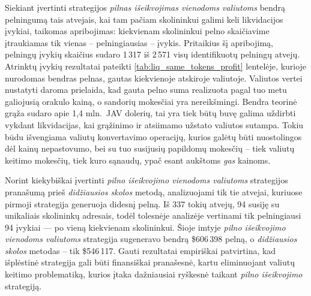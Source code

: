 \documentclass[]{VUMIFTemplateClass}
\begin{document}

Siekiant įvertinti strategijos \textit{pilnas išeikvojimas vienodoms valiutoms} bendrą pelningumą tais atvejais, kai tam pačiam skolininkui galimi keli likvidacijos įvykiai, taikomas apribojimas: kiekvienam skolininkui pelno skaičiavime įtraukiamas tik vienas – pelningiausias – įvykis. Pritaikius šį apribojimą, pelningų įvykių skaičius sudaro 1\,317 iš 2\,571 visų identifikuotų pelningų atvejų. Atrinktų įvykių rezultatai pateikti \ref{tab:liq_same_tokens_profit} lentelėje, kurioje nurodomas bendras pelnas, gautas kiekvienoje atskiroje valiutoje. Valiutos vertei nustatyti daroma prielaida, kad gauta pelno suma realizuota pagal tuo metu galiojusią orakulo kainą, o sandorių mokesčiai yra nereikšmingi. Bendra teorinė grąža sudaro apie 1,4 mln.\ JAV dolerių, tai yra tiek būtų buvę galima uždirbti vykdant likvidacijas, kai grąžinimo ir atsiimamo užstato valiutos sutampa. Tokiu būdu išvengiama valiutų konvertavimo operacijų, kurios galėtų būti nuostolingos dėl kainų nepastovumo, bei su tuo susijusių papildomų mokesčių – tiek valiutų keitimo mokesčių, tiek kuro sąnaudų, ypač esant aukštoms \textit{gas} kainoms.


Norint kiekybiškai įvertinti \textit{pilno išeikvojimo vienodoms valiutoms} strategijos pranašumą prieš \textit{didžiausios skolos} metodą, analizuojami tik tie atvejai, kuriuose pirmoji strategija generuoja didesnį pelną. Iš 337 tokių atvejų, 94 susiję su unikaliais skolininkų adresais, todėl tolesnėje analizėje vertinami tik pelningiausi 94 įvykiai — po vieną kiekvienam skolininkui. Šioje imtyje \textit{pilno išeikvojimo vienodoms valiutoms} strategija sugeneravo bendrą \$606\,398 pelną, o \textit{didžiausios skolos} metodas – tik \$546\,117. Gauti rezultatai empiriškai patvirtina, kad išplėstinė strategija gali būti finansiškai pranašesnė, kartu eliminuojant valiutų keitimo problematiką, kurios įtaka dažniausiai ryškesnė taikant \textit{pilno išeikvojimo} strategiją.
\end{document}
